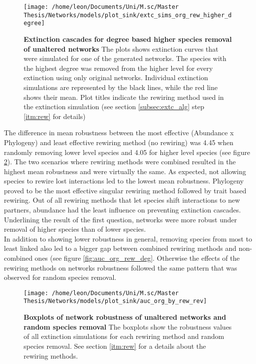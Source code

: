 \documentclass[12pt,a4paper]{article}
\begin{document}
\begin{figure}[H]
	 \centering
	 \texttt{[image: /home/leon/Documents/Uni/M.sc/Master Thesis/Networks/models/plot\_sink/extc\_sims\_org\_rew\_higher\_degree]}
	 \captionsetup{width = \textwidth}
	 \caption[Extinction cascades for degree based higher species removal of unaltered networks]{\textbf{Extinction cascades for degree based higher species removal of unaltered networks} The plots shows extinction curves that were simulated for one of the generated networks. The species with the highest degree was removed from the higher level for every extinction using only original networks. Individual extinction simulations are represented by the black lines, while the red line shows their mean. Plot titles indicate the rewiring method used in the extinction simulation (see section \ref{subsec:extc_alg} step \ref{itm:rew} for details)}
	 \label{fig:extc_org_rew_higher_deg}
\end{figure}






The difference in mean robustness between the most effective (Abundance x Phylogeny) and least effective rewiring method (no rewiring) was 4.45 when randomly removing lower level species and 4.05 for higher level species (see figure \ref{fig:auc_org_rew}). The two scenarios where rewiring methods were combined resulted in the highest mean robustness and were virtually the same. As expected, not allowing species to rewire lost interactions led to the lowest mean robustness. Phylogeny proved to be the most effective singular rewiring method followed by trait based rewiring. Out of all rewiring methods that let species shift interactions to new partners, abundance had the least influence on preventing extinction cascades. 
Underlining the result of the first question, networks were more robust under removal of higher species than of lower species. \\

In addition to showing lower robustness in general, removing species from most to least linked also led to a bigger gap between combined rewiring methods and non-combined ones (see figure \ref{fig:auc_org_rew_deg}. Otherwise the effects of the rewiring methods on networks robustness followed the same pattern that was observed for random species removal.\par

\begin{figure}[H]
	 \centering
	 \texttt{[image: /home/leon/Documents/Uni/M.sc/Master Thesis/Networks/models/plot\_sink/auc\_org\_by\_rew\_rev]}
	 \captionsetup{width = \textwidth}
	 \caption[Boxplots of network robustness of unaltered networks and random species removal]{\textbf{Boxplots of network robustness of unaltered networks and random species removal} The boxplots show the robustness values of all extinction simulations for each rewiring method and random species removal. See section \ref{itm:rew} for a details about the rewiring methods.}
	 \label{fig:auc_org_rew}
\end{figure}
\end{document}
